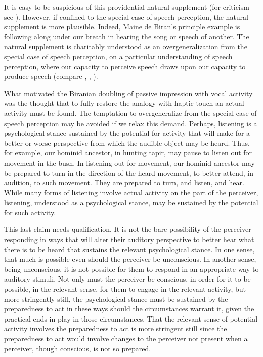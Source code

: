 It is easy to be suspicious of this providential natural supplement (for criticism see \citealt[chapter 7]{Derrida:2005aa}). However, if confined to the special case of speech perception, the natural supplement is more plausible. Indeed, Maine de Biran's principle example is following along under our breath in hearing the song or speech of another. The natural supplement is charitably understood as an overgeneralization from the special case of speech perception, on a particular understanding of speech perception, where our capacity to perceive speech draws upon our capacity to produce speech (compare \citealt[chapter 2]{Bergson:1912pi}, \citealt{Liberman:1985ty}, \citealt{Mole:2009hl}). 

What motivated the Biranian doubling of passive impression with vocal activity was the thought that to fully restore the analogy with haptic touch an actual activity must be found. The temptation to overgeneralize from the special case of speech perception may be avoided if we relax this demand. Perhaps, listening is a psychological stance sustained by the potential for activity that will make for a better or worse perspective from which the audible object may be heard. Thus, for example, our hominid ancestor, in hunting tapir, may pause to listen out for movement in the bush. In listening out for movement, our hominid ancestor may be prepared to turn in the direction of the heard movement, to better attend, in audition, to such movement. They are prepared to turn, and listen, and hear. While many forms of listening involve actual activity on the part of the perceiver, listening, understood as a psychological stance, may be sustained by the potential for such activity.

This last claim needs qualification. It is not the bare possibility of the perceiver responding in ways that will alter their auditory perspective to better hear what there is to be heard that sustains the relevant psychological stance. In one sense, that much is possible even should the perceiver be unconscious. In another sense, being unconscious, it is not possible for them to respond in an appropriate way to auditory stimuli. Not only must the perceiver be conscious, in order for it to be possible, in the relevant sense, for them to engage in the relevant activity, but more stringently still, the psychological stance must be sustained by the preparedness to act in these ways should the circumstances warrant it, given the practical ends in play in those circumstances. That the relevant sense of potential activity involves the preparedness to act is more stringent still since the preparedness to act would involve changes to the perceiver not present when a perceiver, though conscious, is not so prepared.

